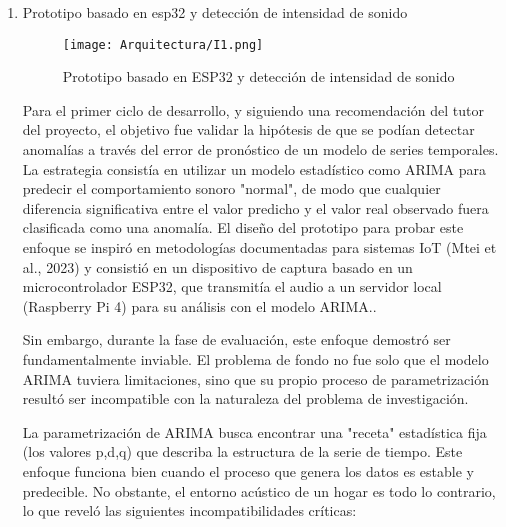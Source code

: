 \begin{enumerate}
      \item Prototipo basado en esp32 y detección de intensidad de sonido

            \begin{figure}[h!]
                  \centering
                  \texttt{[image: Arquitectura/I1.png]}
                  \caption{Prototipo basado en ESP32 y detección de intensidad de sonido}
                  \label{fig:prototipo1}
            \end{figure}

            Para el primer ciclo de desarrollo, y siguiendo una recomendación del tutor del proyecto, el objetivo fue validar la hipótesis de que se podían detectar anomalías a través del error de pronóstico de un modelo de series temporales. La estrategia consistía en utilizar un modelo estadístico como ARIMA para predecir el comportamiento sonoro "normal", de modo que cualquier diferencia significativa entre el valor predicho y el valor real observado fuera clasificada como una anomalía. El diseño del prototipo para probar este enfoque se inspiró en metodologías documentadas para sistemas IoT (Mtei et al., 2023) y consistió en un dispositivo de captura basado en un microcontrolador ESP32, que transmitía el audio a un servidor local (Raspberry Pi 4) para su análisis con el modelo ARIMA..

            Sin embargo, durante la fase de evaluación, este enfoque demostró ser fundamentalmente inviable. El problema de fondo no fue solo que el modelo ARIMA tuviera limitaciones, sino que su propio proceso de parametrización resultó ser incompatible con la naturaleza del problema de investigación.

            La parametrización de ARIMA busca encontrar una "receta" estadística fija (los valores p,d,q) que describa la estructura de la serie de tiempo. Este enfoque funciona bien cuando el proceso que genera los datos es estable y predecible. No obstante, el entorno acústico de un hogar es todo lo contrario, lo que reveló las siguientes incompatibilidades críticas:


\end{enumerate}
